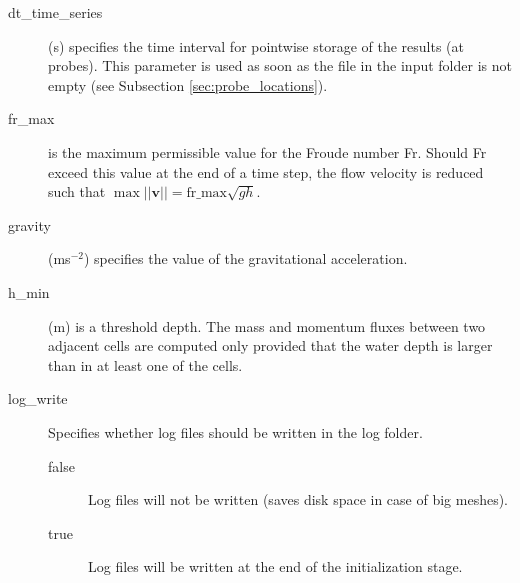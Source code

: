 \begin{description}
\item[dt\_time\_series](s) specifies the time interval for pointwise storage of the results (at probes). This parameter is used as soon as the file  in the input folder is not empty (see Subsection \ref{sec:probe_locations}).

\item[fr\_max]  is the maximum permissible value for the Froude number Fr. Should Fr exceed this value at the end of a time step, the flow velocity is reduced such that $\max ||\mathbf{v}|| = \mathrm{fr\_max} \sqrt{gh}$.

\item[gravity] (ms$^{-2}$) specifies the value of the gravitational acceleration.

\item[h\_min] (m) is a threshold depth. The mass and momentum fluxes between two adjacent cells are computed only provided that the water depth is larger than  in at least one of the cells.


\item [log\_write]  Specifies whether log files should be written in the log folder.
\begin{description}
\item [false] Log files will not be written (saves disk space in case of big meshes).
\item [true] Log files will be written at the end of the initialization stage.
\end{description}



\end{description}
